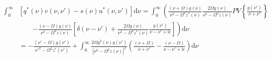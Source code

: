 \begin{equation}\label{eq:qv-minus-su-integral}
\begin{split}
\int_0^\infty&\left[q^*(\nu)v(\nu,\nu') - s(\nu)u^*(\nu,\nu')\right]\mathrm{d}\nu = \int_0^\infty\left(\frac{(\nu + \Omega)g(\nu)}{\nu^2 - \Omega^2z^*(\nu)}\frac{2\Omega g(\nu)}{\nu^2 - \Omega^2z(\nu)}PV\left\{\frac{g(\nu')}{\nu + \nu'}\right\}\right.\\
&\qquad\left. - \frac{(\nu - \Omega)g(\nu)}{\nu^2 - \Omega^2z(\nu)}\left[\delta(\nu - \nu') + \frac{2\Omega g(\nu)}{\nu^2 - \Omega^2z^*(\nu)}\frac{g(\nu')}{\nu - \nu' + \mathrm{i}\epsilon}\right]\right)\mathrm{d}\nu\\[0.5em]
&= -\frac{(\nu' - \Omega)g(\nu')}{\nu'^2 - \Omega^2z^*(\nu')} + \int_0^\infty\frac{2\Omega g^2(\nu)g(\nu')}{|\nu^2 - \Omega^2z(\nu)|^2}\left(\frac{(\nu + \Omega)}{\nu + \nu'} - \frac{(\nu - \Omega)}{\nu - \nu' + \mathrm{i}\epsilon}\right)\mathrm{d}\nu\\

\end{split}
\end{equation}
